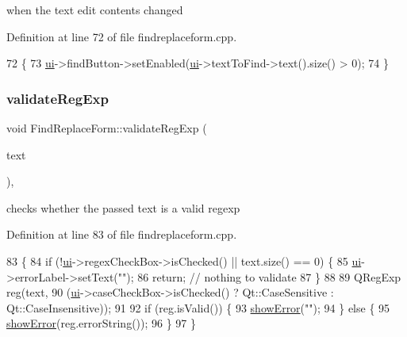 when the text edit contents changed 



Definition at line 72 of file findreplaceform.\+cpp.


\begin{DoxyCode}
72                                         \{
73     \hyperlink{class_find_replace_form_a9bf9e9096feff863dcd6c2a989e07d2c}{ui}->findButton->setEnabled(\hyperlink{class_find_replace_form_a9bf9e9096feff863dcd6c2a989e07d2c}{ui}->textToFind->text().size() > 0);
74 \}
\end{DoxyCode}
\mbox{\label{class_find_replace_form_a2867ac36c3f8c9accb7f0c010ee74522}} 
\subsubsection{\texorpdfstring{validate\+Reg\+Exp}{validateRegExp}}
{\footnotesize\ttfamily void Find\+Replace\+Form\+::validate\+Reg\+Exp (\begin{DoxyParamCaption}\item[{const Q\+String \&}]{text }\end{DoxyParamCaption})\hspace{0.3cm}{\ttfamily [protected]}, {\ttfamily [slot]}}



checks whether the passed text is a valid regexp 



Definition at line 83 of file findreplaceform.\+cpp.


\begin{DoxyCode}
83                                                         \{
84     \textcolor{keywordflow}{if} (!\hyperlink{class_find_replace_form_a9bf9e9096feff863dcd6c2a989e07d2c}{ui}->regexCheckBox->isChecked() || text.size() == 0) \{
85         \hyperlink{class_find_replace_form_a9bf9e9096feff863dcd6c2a989e07d2c}{ui}->errorLabel->setText(\textcolor{stringliteral}{""});
86         \textcolor{keywordflow}{return}; \textcolor{comment}{// nothing to validate}
87     \}
88 
89     QRegExp reg(text,
90                 (\hyperlink{class_find_replace_form_a9bf9e9096feff863dcd6c2a989e07d2c}{ui}->caseCheckBox->isChecked() ? Qt::CaseSensitive : Qt::CaseInsensitive));
91 
92     \textcolor{keywordflow}{if} (reg.isValid()) \{
93         \hyperlink{class_find_replace_form_a49bcdfa2193f0fb5fa8ccbbf1875d893}{showError}(\textcolor{stringliteral}{""});
94     \} \textcolor{keywordflow}{else} \{
95         \hyperlink{class_find_replace_form_a49bcdfa2193f0fb5fa8ccbbf1875d893}{showError}(reg.errorString());
96     \}
97 \}
\end{DoxyCode}
\mbox{\label{class_find_replace_form_a8746401be4fbab54b6019a76e05e7b43}} 
